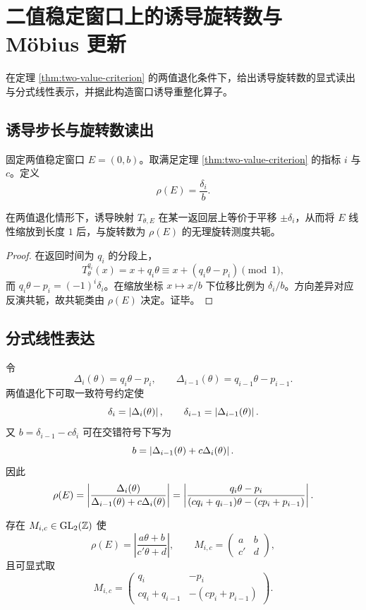 \section{二值稳定窗口上的诱导旋转数与 Möbius 更新}

在定理 \ref{thm:two-value-criterion} 的两值退化条件下，给出诱导旋转数的显式读出与分式线性表示，并据此构造窗口诱导重整化算子。

\subsection{诱导步长与旋转数读出}

固定两值稳定窗口 $E=(0,b)$。取满足定理 \ref{thm:two-value-criterion} 的指标 $i$ 与 $c$。定义
\[
\rho(E)=\frac{\delta_i}{b}.
\]

\begin{proposition}\label{prop:induced-step}
在两值退化情形下，诱导映射 $T_{\theta,E}$ 在某一返回层上等价于平移 $\pm\delta_i$，从而将 $E$ 线性缩放到长度 $1$ 后，与旋转数为 $\rho(E)$ 的无理旋转测度共轭。
\end{proposition}

\begin{proof}
在返回时间为 $q_i$ 的分段上，
\[
T_\theta^{q_i}(x)=x+q_i\theta \equiv x+(q_i\theta-p_i)\pmod 1,
\]
而 $q_i\theta-p_i=(-1)^i\delta_i$。在缩放坐标 $x\mapsto x/b$ 下位移比例为 $\delta_i/b$。方向差异对应反演共轭，故共轭类由 $\rho(E)$ 决定。证毕。
\end{proof}

\subsection{分式线性表达}

令
\[
\Delta_i(\theta)=q_i\theta-p_i,\qquad \Delta_{i-1}(\theta)=q_{i-1}\theta-p_{i-1}.
\]
两值退化下可取一致符号约定使
\[
\delta_i=\left\lvert \Delta_i(\theta)\right\rvert,\qquad \delta_{i-1}=\left\lvert \Delta_{i-1}(\theta)\right\rvert.
\]
又 $b=\delta_{i-1}-c\delta_i$ 可在交错符号下写为
\[
b=\left\lvert \Delta_{i-1}(\theta)+c\Delta_i(\theta)\right\rvert.
\]
因此
\[
\rho(E)=\left\lvert \frac{\Delta_i(\theta)}{\Delta_{i-1}(\theta)+c\Delta_i(\theta)}\right\rvert
=\left\lvert \frac{q_i\theta-p_i}{(c q_i+q_{i-1})\theta-(c p_i+p_{i-1})}\right\rvert.
\]

\begin{theorem}\label{thm:mobius}
存在 $M_{i,c}\in \mathrm{GL}_2(\mathbb{Z})$ 使
\[
\rho(E)=\left|\frac{a\theta+b}{c'\theta+d}\right|,
\qquad
M_{i,c}=\begin{pmatrix}a&b\\c'&d\end{pmatrix},
\]
且可显式取
\[
M_{i,c}=
\begin{pmatrix}
q_i & -p_i\\
c q_i+q_{i-1} & -(c p_i+p_{i-1})
\end{pmatrix}.
\]
\end{theorem}

